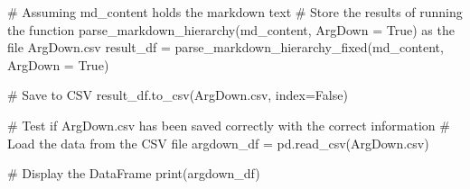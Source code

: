\documentclass[
  11pt,
  letterpaper,
]{book}
\newenvironment{Shaded}{\begin{snugshade}}{\end{snugshade}}
\newcommand{\BuiltInTok}[1]{\textcolor[rgb]{0.00,0.23,0.31}{#1}}
\newcommand{\CommentTok}[1]{\textcolor[rgb]{0.37,0.37,0.37}{#1}}
\newcommand{\NormalTok}[1]{\textcolor[rgb]{0.00,0.23,0.31}{#1}}
\newcommand{\OperatorTok}[1]{\textcolor[rgb]{0.37,0.37,0.37}{#1}}
\newcommand{\StringTok}[1]{\textcolor[rgb]{0.13,0.47,0.30}{#1}}
\newcommand{\VariableTok}[1]{\textcolor[rgb]{0.07,0.07,0.07}{#1}}
\begin{document}
\begin{Shaded}
\begin{Highlighting}[]
\CommentTok{\# Assuming \textquotesingle{}md\_content\textquotesingle{} holds the markdown text}
\CommentTok{\# Store the results of running the function parse\_markdown\_hierarchy(md\_content, ArgDown = True) as the file \textquotesingle{}ArgDown.csv\textquotesingle{}}
\NormalTok{result\_df }\OperatorTok{=}\NormalTok{ parse\_markdown\_hierarchy\_fixed(md\_content, ArgDown }\OperatorTok{=} \VariableTok{True}\NormalTok{)}

\CommentTok{\# Save to CSV}
\NormalTok{result\_df.to\_csv(}\StringTok{\textquotesingle{}ArgDown.csv\textquotesingle{}}\NormalTok{, index}\OperatorTok{=}\VariableTok{False}\NormalTok{)}
\end{Highlighting}
\end{Shaded}

\begin{Shaded}
\begin{Highlighting}[]
\CommentTok{\# Test if \textquotesingle{}ArgDown.csv\textquotesingle{} has been saved correctly with the correct information}
\CommentTok{\# Load the data from the CSV file}
\NormalTok{argdown\_df }\OperatorTok{=}\NormalTok{ pd.read\_csv(}\StringTok{\textquotesingle{}ArgDown.csv\textquotesingle{}}\NormalTok{)}

\CommentTok{\# Display the DataFrame}
\BuiltInTok{print}\NormalTok{(argdown\_df)}
\end{Highlighting}
\end{Shaded}
\end{document}
